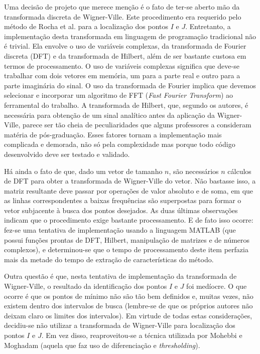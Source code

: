 Uma decisão de projeto que merece menção é o fato de ter-se aberto mão da transformada discreta de Wigner-Ville. Este procedimento era requerido pelo método de Rocha et al. para a localização dos pontos $I$ e $J$. Entretanto, a implementação desta transformada em linguagem de programação tradicional não é trivial. Ela envolve o uso de variáveis complexas, da transformada de Fourier discreta (DFT) e da transformada de Hilbert, além de ser bastante custosa em termos de processamento. O uso de variáveis complexas significa que deve-se trabalhar com dois vetores em memória, um para a parte real e outro para a parte imaginária do sinal. O uso da transformada de Fourier implica que devemos selecionar e incorporar um algoritmo de FFT (\emph{Fast Fourier Transform}) ao ferramental do trabalho. A transformada de Hilbert, que, segundo os autores, é necessária para obtenção de um sinal analítico antes da aplicação da Wigner-Ville, parece ser tão cheia de peculiaridades que alguns professores a consideram matéria de pós-graduação. Esses fatores tornam a implementação mais complicada e demorada, não só pela complexidade mas porque todo código desenvolvido deve ser testado e validado. 

Há ainda o fato de que, dado um vetor de tamanho $n$, são necessários $n$ cálculos de DFT para obter a transformada de Wigner-Ville do vetor. Não bastasse isso, a matriz resultante deve passar por operações de valor absoluto e de soma, em que as linhas correspondentes a baixas frequências são superpostas para formar o vetor subjacente à busca dos pontos desejados. As duas últimas observações indicam que o procedimento exige bastante processamento. E de fato isso ocorre: fez-se uma tentativa de implementação usando a linguagem MATLAB (que possui funções prontas de DFT, Hilbert, manipulação de matrizes e de números complexos), e determinou-se que o tempo de processamento deste item perfazia mais da metade do tempo de extração de características do método.

Outra questão é que, nesta tentativa de implementação da transformada de Wigner-Ville, o resultado da identificação dos pontos $I$ e $J$ foi medíocre. O que ocorre é que os pontos de mínimo não são tão bem definidos e, muitas vezes, não existem dentro dos intervalos de busca (lembre-se de que os próprios autores não deixam claro os limites dos intervalos). Em virtude de todas estas considerações, decidiu-se não utilizar a transformada de Wigner-Ville para localização dos pontos $I$ e $J$. Em vez disso, reaproveitou-se a técnica utilizada por Mohebbi e Moghadam (aquela que faz uso de diferenciação e \emph{thresholding}).

